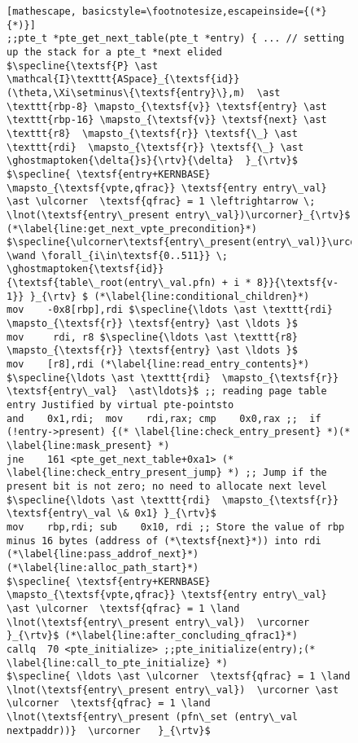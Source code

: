 \begin{figure}%
\ifPLDI
\begin{lstlisting}[mathescape, basicstyle=\footnotesize,escapeinside={(*}{*)}]
;;pte_t *pte_get_next_table(pte_t *entry) { ... // setting up the stack for a pte_t *next elided
$\specline{\textsf{P} \ast \mathcal{I}\texttt{ASpace}_{\textsf{id}}(\theta,\Xi\setminus\{\textsf{entry}\},m)  \ast \texttt{rbp-8} \mapsto_{\textsf{v}} \textsf{entry} \ast  \texttt{rbp-16} \mapsto_{\textsf{v}} \textsf{next} \ast \texttt{r8}  \mapsto_{\textsf{r}} \textsf{\_} \ast \texttt{rdi}  \mapsto_{\textsf{r}} \textsf{\_} \ast \ghostmaptoken{\delta{}s}{\rtv}{\delta}  }_{\rtv}$
$\specline{ \textsf{entry+KERNBASE} \mapsto_{\textsf{vpte,qfrac}} \textsf{entry entry\_val} \ast \ulcorner  \textsf{qfrac} = 1 \leftrightarrow \; \lnot(\textsf{entry\_present entry\_val})\urcorner}_{\rtv}$ (*\label{line:get_next_vpte_precondition}*)
$\specline{\ulcorner\textsf{entry\_present(entry\_val)}\urcorner \wand \forall_{i\in\textsf{0..511}} \; \ghostmaptoken{\textsf{id}}{\textsf{table\_root(entry\_val.pfn) + i * 8}}{\textsf{v-1}} }_{\rtv} $ (*\label{line:conditional_children}*)
mov    -0x8[rbp],rdi $\specline{\ldots \ast \texttt{rdi}  \mapsto_{\textsf{r}} \textsf{entry} \ast \ldots }$
mov     rdi, r8 $\specline{\ldots \ast \texttt{r8}  \mapsto_{\textsf{r}} \textsf{entry} \ast \ldots }$
mov    [r8],rdi (*\label{line:read_entry_contents}*) $\specline{\ldots \ast \texttt{rdi}  \mapsto_{\textsf{r}} \textsf{entry\_val}  \ast\ldots}$ ;; reading page table entry Justified by virtual pte-pointsto
and    0x1,rdi;  mov    rdi,rax; cmp    0x0,rax ;;  if (!entry->present) {(* \label{line:check_entry_present} *)(* \label{line:mask_present} *)
jne    161 <pte_get_next_table+0xa1> (* \label{line:check_entry_present_jump} *) ;; Jump if the present bit is not zero; no need to allocate next level
$\specline{\ldots \ast \texttt{rdi}  \mapsto_{\textsf{r}} \textsf{entry\_val \& 0x1} }_{\rtv}$
mov    rbp,rdi; sub    0x10, rdi ;; Store the value of rbp minus 16 bytes (address of (*\textsf{next}*)) into rdi (*\label{line:pass_addrof_next}*)(*\label{line:alloc_path_start}*)
$\specline{ \textsf{entry+KERNBASE} \mapsto_{\textsf{vpte,qfrac}} \textsf{entry entry\_val} \ast \ulcorner  \textsf{qfrac} = 1 \land \lnot(\textsf{entry\_present entry\_val})  \urcorner }_{\rtv}$ (*\label{line:after_concluding_qfrac1}*)
callq  70 <pte_initialize> ;;pte_initialize(entry);(* \label{line:call_to_pte_initialize} *)
$\specline{ \ldots \ast \ulcorner  \textsf{qfrac} = 1 \land \lnot(\textsf{entry\_present entry\_val})  \urcorner \ast \ulcorner  \textsf{qfrac} = 1 \land \lnot(\textsf{entry\_present (pfn\_set (entry\_val nextpaddr))}  \urcorner   }_{\rtv}$

\end{lstlisting}
\end{figure}
